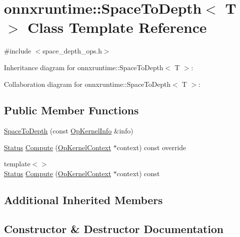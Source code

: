 \hypertarget{classonnxruntime_1_1SpaceToDepth}{}\section{onnxruntime\+:\+:Space\+To\+Depth$<$ T $>$ Class Template Reference}
\label{classonnxruntime_1_1SpaceToDepth}


{\ttfamily \#include $<$space\+\_\+depth\+\_\+ops.\+h$>$}



Inheritance diagram for onnxruntime\+:\+:Space\+To\+Depth$<$ T $>$\+:


Collaboration diagram for onnxruntime\+:\+:Space\+To\+Depth$<$ T $>$\+:
\subsection*{Public Member Functions}
\begin{DoxyCompactItemize}
\item 
\mbox{\hyperlink{classonnxruntime_1_1SpaceToDepth_a1e9505b7c4741d70bb66fec221ef87a9}{Space\+To\+Depth}} (const \mbox{\hyperlink{classonnxruntime_1_1OpKernelInfo}{Op\+Kernel\+Info}} \&info)
\item 
\mbox{\hyperlink{classonnxruntime_1_1common_1_1Status}{Status}} \mbox{\hyperlink{classonnxruntime_1_1SpaceToDepth_af8a3f43b9efd5269850b02eda30a3eba}{Compute}} (\mbox{\hyperlink{classonnxruntime_1_1OpKernelContext}{Op\+Kernel\+Context}} $\ast$context) const override
\item 
{\footnotesize template$<$$>$ }\\\mbox{\hyperlink{classonnxruntime_1_1common_1_1Status}{Status}} \mbox{\hyperlink{classonnxruntime_1_1SpaceToDepth_a13ddb45806a77589bd81bc8618c9a314}{Compute}} (\mbox{\hyperlink{classonnxruntime_1_1OpKernelContext}{Op\+Kernel\+Context}} $\ast$context) const
\end{DoxyCompactItemize}
\subsection*{Additional Inherited Members}


\subsection{Constructor \& Destructor Documentation}
\mbox{\label{classonnxruntime_1_1SpaceToDepth_a1e9505b7c4741d70bb66fec221ef87a9}} 

